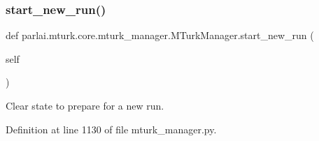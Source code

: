 \subsubsection{\texorpdfstring{start\+\_\+new\+\_\+run()}{start\_new\_run()}}
{\footnotesize\ttfamily def parlai.\+mturk.\+core.\+mturk\+\_\+manager.\+M\+Turk\+Manager.\+start\+\_\+new\+\_\+run (\begin{DoxyParamCaption}\item[{}]{self }\end{DoxyParamCaption})}

\begin{DoxyVerb}Clear state to prepare for a new run.
\end{DoxyVerb}
 

Definition at line 1130 of file mturk\+\_\+manager.\+py.


